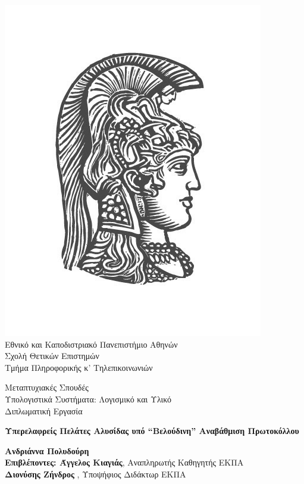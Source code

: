 \begin{center}
    
    \includegraphics[scale=0.8]{figures/logo_uoa.jpg}\\
    {\large Εθνικό και Καποδιστριακό Πανεπιστήμιο Αθηνών \\ 
    Σχολή Θετικών Επιστημών \\ 
    Τμήμα Πληροφορικής κ' Τηλεπικοινωνιών\\}
    \vspace{1cm}
    \begin{LARGE}
        Μεταπτυχιακές Σπουδές \\ 
        Υπολογιστικά Συστήματα: Λογισμικό και Υλικό\\
        \vspace{10mm}
        {Διπλωματική Εργασία}\\
        \vspace{0.8cm}
    \end{LARGE}
    {\textbf{\LARGE Υπερελαφρείς Πελάτες Αλυσίδας υπό ``Βελούδινη'' Αναβάθμιση Πρωτοκόλλου}}\\
    \vspace{2.5cm}


    \textbf{\large Ανδριάννα Πολυδούρη} \\ 
    \vspace{2.5cm} 
    \textbf{\large Επιβλέποντες: Άγγελος Κιαγιάς}\large , Αναπληρωτής Καθηγητής ΕΚΠΑ\\
    \hspace{2.99cm}
    \textbf{\large Διονύσης Ζήνδρος} \large, Υποψήφιος Διδάκτωρ ΕΚΠΑ
    \vspace{2cm}

    \date{Αθήνα, \\ 15η Ιουνίου 2020}
    \pagebreak
\end{center}
